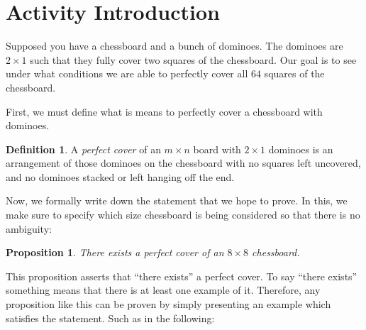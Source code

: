 \documentclass{article}
\theoremstyle{definition}
\newtheorem{definition}{Definition}[]
\theoremstyle{plain}
\newtheorem{proposition}{Proposition}[]
\theoremstyle{activity}
\begin{document}
\section{Activity Introduction}

Supposed you have a chessboard and a bunch of dominoes. The dominoes are $2 \times 1$ such that they fully cover two squares of the chessboard. Our goal is to see under what conditions we are able to perfectly cover all $64$ squares of the chessboard.

First, we must define what is means to perfectly cover a chessboard with dominoes.

\begin{definition}
    A \textit{perfect cover} of an $m \times n$ board with $2 \times 1$ dominoes is an arrangement of those dominoes on the chessboard with no squares left uncovered, and no dominoes stacked or left hanging off the end.
\end{definition}

Now, we formally write down the statement that we hope to prove. In this, we make sure to specify which size chessboard is being considered so that there is no ambiguity:

\begin{proposition}
    There exists a perfect cover of an $8 \times 8$ chessboard.
\end{proposition}

This proposition asserts that ``there exists'' a perfect cover. To say ``there exists'' something means that there is at least one example of it. Therefore, any proposition like this can be proven by simply presenting an example which satisfies the statement. Such as in the following:
\end{document}
